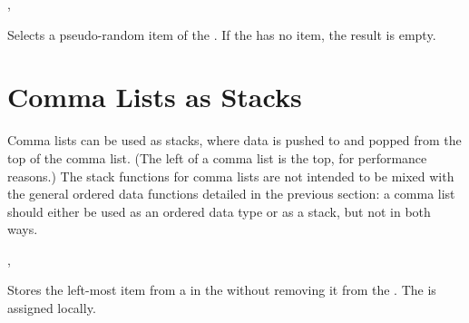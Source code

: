 \documentclass[oneside]{book}
\let\tn=\cs
\begin{document}
\begin{function}{\ClistRandItem,\ClistVarRandItem}
\begin{syntax}
 
 
\end{syntax}
Selects a pseudo-random item of the .
If the  has no item, the result is empty.
\end{function}

\section{Comma Lists as Stacks}
 
Comma lists can be used as stacks, where data is pushed to and popped
from the top of the comma list. (The left of a comma list is the top, for
performance reasons.) The stack functions for comma lists are not
intended to be mixed with the general ordered data functions detailed
in the previous section: a comma list should either be used as an
ordered data type or as a stack, but not in both ways.
 
\begin{function}{\ClistGet,\ClistGetTF}
\begin{syntax}
  
   
   
    
\end{syntax}
Stores the left-most item from a  in the
 without removing it from the
. The  is assigned locally.
\end{function}
 
\end{document}
